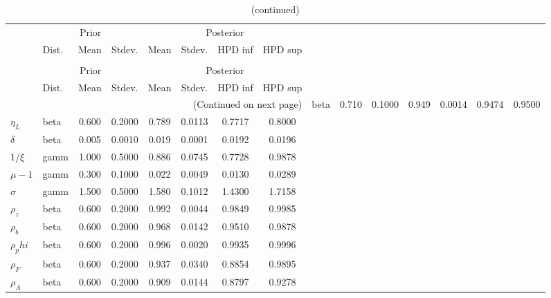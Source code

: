  
\begin{center}
\begin{longtable}{llcccccc} 
\caption{Results from Metropolis-Hastings (parameters)}
 \label{Table:MHPosterior:1}\\
\toprule 
  & \multicolumn{3}{c}{Prior}  &  \multicolumn{4}{c}{Posterior} \\
  \cmidrule(r{.75em}){2-4} \cmidrule(r{.75em}){5-8}
  & Dist. & Mean  & Stdev. & Mean & Stdev. & HPD inf & HPD sup\\
\midrule \endfirsthead 
\caption{(continued)}\\\toprule 
  & \multicolumn{3}{c}{Prior}  &  \multicolumn{4}{c}{Posterior} \\
  \cmidrule(r{.75em}){2-4} \cmidrule(r{.75em}){5-8}
  & Dist. & Mean  & Stdev. & Mean & Stdev. & HPD inf & HPD sup\\
\midrule \endhead 
\bottomrule \multicolumn{8}{r}{(Continued on next page)} \endfoot 
\bottomrule \endlastfoot 
$b$ & beta &   0.710 & 0.1000 &   0.949& 0.0014 &  0.9474 &  0.9500 \\ 
$\eta_L$ & beta &   0.600 & 0.2000 &   0.789& 0.0113 &  0.7717 &  0.8000 \\ 
${\delta}$ & beta &   0.005 & 0.0010 &   0.019& 0.0001 &  0.0192 &  0.0196 \\ 
${1/\xi}$ & gamm &   1.000 & 0.5000 &   0.886& 0.0745 &  0.7728 &  0.9878 \\ 
${\mu-1}$ & gamm &   0.300 & 0.1000 &   0.022& 0.0049 &  0.0130 &  0.0289 \\ 
${\sigma}$ & gamm &   1.500 & 0.5000 &   1.580& 0.1012 &  1.4300 &  1.7158 \\ 
${\rho_z}$ & beta &   0.600 & 0.2000 &   0.992& 0.0044 &  0.9849 &  0.9985 \\ 
${\rho_b}$ & beta &   0.600 & 0.2000 &   0.968& 0.0142 &  0.9510 &  0.9878 \\ 
${\rho_phi}$ & beta &   0.600 & 0.2000 &   0.996& 0.0020 &  0.9935 &  0.9996 \\ 
${\rho_F}$ & beta &   0.600 & 0.2000 &   0.937& 0.0340 &  0.8854 &  0.9895 \\ 
${\rho_A}$ & beta &   0.600 & 0.2000 &   0.909& 0.0144 &  0.8797 &  0.9278 \\ 
\end{longtable}
 \end{center}
